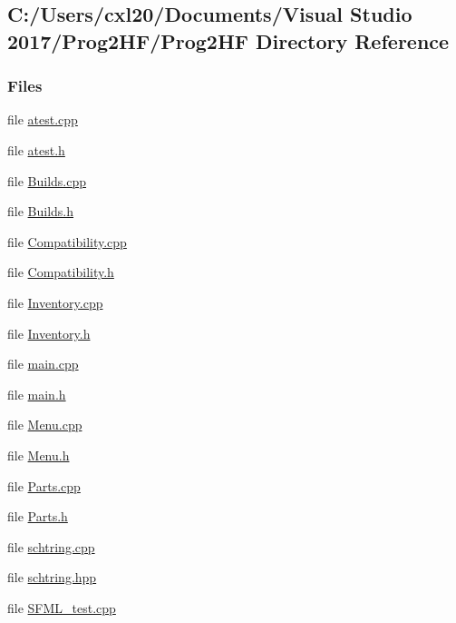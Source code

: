 \subsection{C\+:/\+Users/cxl20/\+Documents/\+Visual Studio 2017/\+Prog2\+H\+F/\+Prog2\+HF Directory Reference}
\label{dir_9ff55877543f9a223593c71c8b414f4c}
\subsubsection*{Files}
\begin{DoxyCompactItemize}
\item 
file \mbox{\hyperlink{atest_8cpp}{atest.\+cpp}}
\item 
file \mbox{\hyperlink{atest_8h}{atest.\+h}}
\item 
file \mbox{\hyperlink{_builds_8cpp}{Builds.\+cpp}}
\item 
file \mbox{\hyperlink{_builds_8h}{Builds.\+h}}
\item 
file \mbox{\hyperlink{_compatibility_8cpp}{Compatibility.\+cpp}}
\item 
file \mbox{\hyperlink{_compatibility_8h}{Compatibility.\+h}}
\item 
file \mbox{\hyperlink{_inventory_8cpp}{Inventory.\+cpp}}
\item 
file \mbox{\hyperlink{_inventory_8h}{Inventory.\+h}}
\item 
file \mbox{\hyperlink{main_8cpp}{main.\+cpp}}
\item 
file \mbox{\hyperlink{main_8h}{main.\+h}}
\item 
file \mbox{\hyperlink{_menu_8cpp}{Menu.\+cpp}}
\item 
file \mbox{\hyperlink{_menu_8h}{Menu.\+h}}
\item 
file \mbox{\hyperlink{_parts_8cpp}{Parts.\+cpp}}
\item 
file \mbox{\hyperlink{_parts_8h}{Parts.\+h}}
\item 
file \mbox{\hyperlink{schtring_8cpp}{schtring.\+cpp}}
\item 
file \mbox{\hyperlink{schtring_8hpp}{schtring.\+hpp}}
\item 
file \mbox{\hyperlink{_s_f_m_l__test_8cpp}{S\+F\+M\+L\+\_\+test.\+cpp}}
\end{DoxyCompactItemize}
